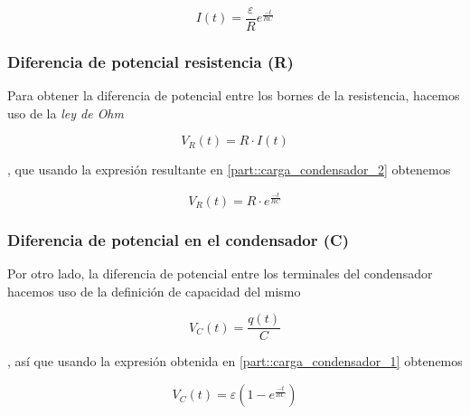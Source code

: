 \documentclass[../main.tex]{subfiles}
\begin{document}
\begin{equation}
    I(t) = \frac{\varepsilon}{R} e^{\frac{-t}{RC}}
\end{equation}

\subsubsection{Diferencia de potencial resistencia (R)}
\label{part::carga_condensador_3}
Para obtener la diferencia de potencial entre los bornes de la resistencia, hacemos uso de la \textit{ley de Ohm}

\begin{equation}
    V_R(t) = R \cdot I(t)
    \label{eqq::dif_potencial_resistencia}
\end{equation}


, que usando la expresión resultante en \ref{part::carga_condensador_2} obtenemos

\begin{equation}
    V_R(t) = R \cdot e^{\frac{-t}{RC}}
\end{equation}

\subsubsection{Diferencia de potencial en el condensador (C)}
\label{part::carga_condensador_4}
Por otro lado, la diferencia de potencial entre los terminales del condensador hacemos uso de la definición de capacidad del mismo 

\begin{equation}
    V_C(t) = \frac{q(t)}{C}
    \label{eqq::dif_potencial_condensador}
\end{equation}

, así que usando la expresión obtenida en \ref{part::carga_condensador_1} obtenemos

\begin{equation}
    V_C(t) = \varepsilon \left( 1- e^{\frac{-t}{RC}}\right)
\end{equation}
\end{document}

